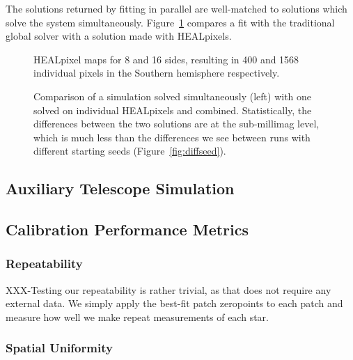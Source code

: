 \documentclass[12pt,preprint]{aastex}
\begin{document}
The solutions returned by fitting in parallel are well-matched to solutions which solve the system simultaneously.  Figure~\ref{fig:hpvglobal} compares a fit with the traditional global solver with a solution made with HEALpixels.  


\begin{figure}
\caption{HEALpixel maps for 8 and 16 sides, resulting in 400 and 1568 individual pixels in the Southern hemisphere respectively.}
\end{figure}


\begin{figure}
\caption{Comparison of a simulation solved simultaneously (left) with one solved on individual HEALpixels and combined.  Statistically, the differences between the two solutions are at the sub-millimag level, which is much less than the differences we see between runs with different starting seeds (Figure~\ref{fig:diffseed}). \label{fig:hpvglobal}}
\end{figure}



\subsection{Auxiliary Telescope Simulation}

\subsection{Calibration Performance Metrics}

\subsubsection{Repeatability}

XXX-Testing our repeatability is rather trivial, as that does not require
any external data.  We simply apply the best-fit patch zeropoints to
each patch and measure how well we make repeat measurements of each
star.

\subsubsection{Spatial Uniformity}
\end{document}
